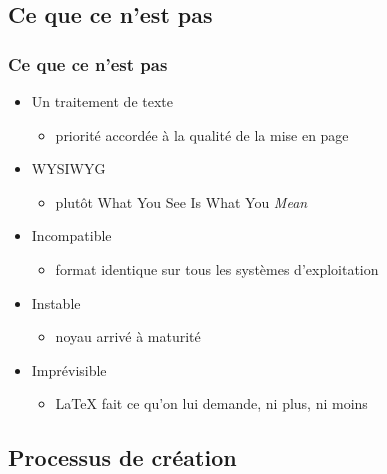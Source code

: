 \subsection{Ce que ce n'est pas}

\begin{frame}
  \frametitle{Ce que ce n'est pas}
  \begin{itemize}
  \item Un traitement de texte
    \begin{itemize}
    \item priorité accordée à la qualité de la mise en page
    \end{itemize}
  \item WYSIWYG
    \begin{itemize}
    \item plutôt What You See Is What You \emph{Mean}
    \end{itemize}
  \item Incompatible
    \begin{itemize}
    \item format identique sur tous les systèmes d'exploitation
    \end{itemize}
  \item Instable
    \begin{itemize}
    \item noyau arrivé à maturité
    \end{itemize}
  \item Imprévisible
    \begin{itemize}
    \item {\LaTeX} fait ce qu'on lui demande, ni plus, ni moins
    \end{itemize}
  \end{itemize}
\end{frame}

\subsection{Processus de création}

